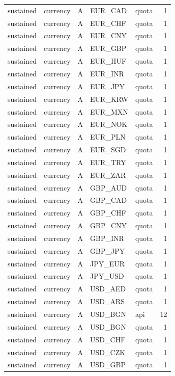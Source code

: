 \begin{tabular}{lllllr}
sustained & currency & A & EUR_CAD & quota & 1 \\
sustained & currency & A & EUR_CHF & quota & 1 \\
sustained & currency & A & EUR_CNY & quota & 1 \\
sustained & currency & A & EUR_GBP & quota & 1 \\
sustained & currency & A & EUR_HUF & quota & 1 \\
sustained & currency & A & EUR_INR & quota & 1 \\
sustained & currency & A & EUR_JPY & quota & 1 \\
sustained & currency & A & EUR_KRW & quota & 1 \\
sustained & currency & A & EUR_MXN & quota & 1 \\
sustained & currency & A & EUR_NOK & quota & 1 \\
sustained & currency & A & EUR_PLN & quota & 1 \\
sustained & currency & A & EUR_SGD & quota & 1 \\
sustained & currency & A & EUR_TRY & quota & 1 \\
sustained & currency & A & EUR_ZAR & quota & 1 \\
sustained & currency & A & GBP_AUD & quota & 1 \\
sustained & currency & A & GBP_CAD & quota & 1 \\
sustained & currency & A & GBP_CHF & quota & 1 \\
sustained & currency & A & GBP_CNY & quota & 1 \\
sustained & currency & A & GBP_INR & quota & 1 \\
sustained & currency & A & GBP_JPY & quota & 1 \\
sustained & currency & A & JPY_EUR & quota & 1 \\
sustained & currency & A & JPY_USD & quota & 1 \\
sustained & currency & A & USD_AED & quota & 1 \\
sustained & currency & A & USD_ARS & quota & 1 \\
sustained & currency & A & USD_BGN & api & 12 \\
sustained & currency & A & USD_BGN & quota & 1 \\
sustained & currency & A & USD_CHF & quota & 1 \\
sustained & currency & A & USD_CZK & quota & 1 \\
sustained & currency & A & USD_GBP & quota & 1 \\

\end{tabular}
